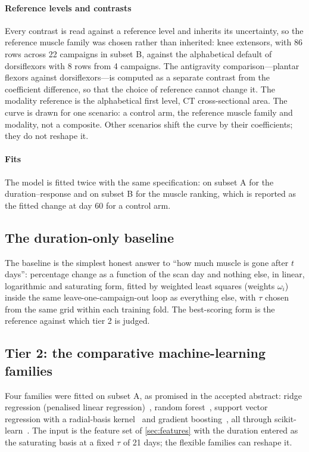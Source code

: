 \paragraph{Reference levels and contrasts} Every contrast is read against a reference level and inherits its
uncertainty, so the reference muscle family was chosen rather than inherited: knee extensors, with 86 rows across 22
campaigns in subset B, against the alphabetical default of dorsiflexors with 8 rows from 4 campaigns. The
antigravity comparison---plantar flexors against dorsiflexors---is computed as a separate contrast from the
coefficient difference, so that the choice of reference cannot change it. The modality reference is the
alphabetical first level, CT cross-sectional area. The curve is drawn for one scenario: a control arm, the
reference muscle family and modality, not a composite. Other scenarios shift the curve by their coefficients; they
do not reshape it.

\paragraph{Fits} The model is fitted twice with the same specification: on subset A for the duration--response and
on subset B for the muscle ranking, which is reported as the fitted change at day 60 for a control arm.

\subsection{The duration-only baseline}
\label{sec:baseline}

The baseline is the simplest honest answer to ``how much muscle is gone after $t$ days'': percentage change as a
function of the scan day and nothing else, in linear, logarithmic and saturating form, fitted by weighted least
squares (weights $\omega_i$) inside the same leave-one-campaign-out loop as everything else, with $\tau$ chosen from
the same grid within each training fold. The best-scoring form is the reference against which tier 2 is judged.

\subsection{Tier 2: the comparative machine-learning families}
\label{sec:tier2}

Four families were fitted on subset A, as promised in the accepted abstract: ridge regression (penalised linear
regression)~\citep{hoerl1970}, random forest~\citep{breiman2001}, support vector regression with a radial-basis
kernel~\citep{smola2004} and gradient boosting~\citep{friedman2001}, all through scikit-learn~\citep{pedregosa2011}.
The input is the feature set of \cref{sec:features} with the duration entered as the saturating basis at a fixed
$\tau$ of 21 days; the flexible families can reshape it.

